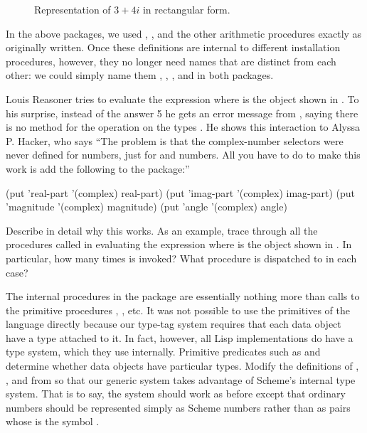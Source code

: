 \begin{figure}[tb]
	\centering
	
	\caption{Representation of \( 3 + 4i \) in rectangular form.}
	\label{Figure 2.24}
\end{figure}

In the above packages, we used , , and the other arithmetic procedures exactly as originally written.
Once these definitions are internal to different installation procedures, however, they no longer need names that are distinct from each other:
we could simply name them , , , and  in both packages.



\begin{exercise}
	\label{Exercise 2.77}
	Louis Reasoner tries to evaluate the expression  where  is the object shown in .
	To his surprise, instead of the answer 5 he gets an error message from , saying there is no method for the operation  on the types .
	He shows this interaction to Alyssa P.
	Hacker, who says “The problem is that the complex-number selectors were never defined for  numbers, just for  and  numbers.
	All you have to do to make this work is add the following to the  package:”
	\begin{scheme}
	  (put 'real-part '(complex) real-part)
	  (put 'imag-part '(complex) imag-part)
	  (put 'magnitude '(complex) magnitude)
	  (put 'angle '(complex) angle)
	\end{scheme}
	Describe in detail why this works.
	As an example, trace through all the procedures called in evaluating the expression  where  is the object shown in .
	In particular, how many times is  invoked?
	What procedure is dispatched to in each case?
\end{exercise}



\begin{exercise}
	\label{Exercise 2.78}
	The internal procedures in the  package are essentially nothing more than calls to the primitive procedures \code{+}, \code{-}, etc.
	It was not possible to use the primitives of the language directly because our type-tag system requires that each data object have a type attached to it.
	In fact, however, all Lisp implementations do have a type system, which they use internally.
	Primitive predicates such as  and   determine whether data objects have particular types.
	Modify the definitions of , , and  from  so that our generic system takes advantage of Scheme’s internal type system.
	That is to say, the system should work as before except that ordinary numbers should be represented simply as Scheme numbers rather than as pairs whose  is the symbol .
\end{exercise}



